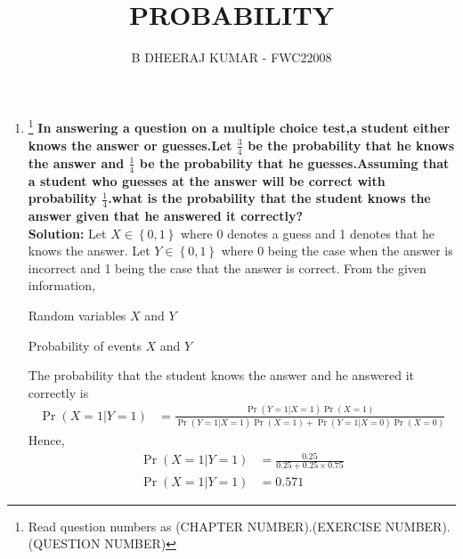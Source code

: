 \documentclass{article}
\providecommand{\cbrak}[1]{\ensuremath{\left\{#1\right\}}}
\providecommand{\pr}[1]{\ensuremath{\Pr\left(#1\right)}}
\begin{document}
\title{PROBABILITY}
\author{\Large B DHEERAJ KUMAR - FWC22008}
\date{}

\maketitle
\begin{enumerate}[label=13.\arabic{enumi}.\arabic{enumii}]%
\setcounter{enumi}{2}
\setcounter{enumii}{4}

\item \footnote{Read question numbers as (CHAPTER NUMBER).(EXERCISE NUMBER).(QUESTION NUMBER)}
\textbf{In answering a question on a multiple choice test,a student either knows the answer or guesses.Let $\frac{3}{4}$
 be the probability that he knows the answer and $\frac{1}{4}$ be the probability that he guesses.Assuming that a student who guesses at the answer will be correct with probability $\frac{1}{4}$.what is the probability that the student knows the answer given that he answered it correctly?}
\vspace{2mm}\\
 \textbf{Solution:}
Let $X \in \cbrak{0,1}$ where 0 denotes a guess and 1 denotes that he knows the answer. Let $Y \in \cbrak{0,1}$ where 0 being the case when the answer is incorrect and 1 being the  case that the answer is correct.
From the given information,
\begin{table}[h]
	
	 \caption{Random variables $X$ and $Y$}\label{table:2}   
\end{table}

\begin{table}[h]
	
	\caption{Probability of events $X$ and $Y$}\label{table:1} 
\end{table}
The probability that the student knows the answer and he answered it correctly is \\
{\footnotesize
\begin{align*}
\pr{X=1|Y=1} &=\frac{\pr{Y=1|X=1}\pr{X=1}}{\pr{Y=1|X=1}\pr{X=1}+\pr{Y=1|X=0}\pr{X=0}}
\end{align*}
}
Hence,
\begin{align*}
\pr{X=1|Y=1}&=\frac{0.25}{{0.25}+{0.25\times 0.75}}
\\
\pr{X=1|Y=1}&=0.571
\end{align*}

\end{enumerate}
\end{document}
